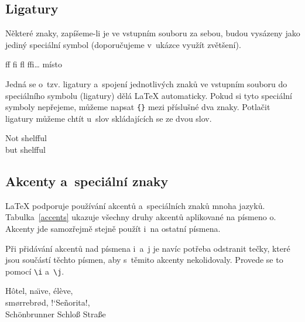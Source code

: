 \subsection{Ligatury}

Některé znaky, zapíšeme-li je ve vstupním souboru za sebou, budou
vysázeny jako jediný speciální symbol (doporučujeme v~ukázce využít zvětšení).
\begin{code}
{\large ff fi fl ffi\ldots}\quad
místo 
\end{code}
Jedná se o~tzv. ligatury a~spojení jednotlivých znaků ve vstupním
souboru do speciálního symbolu (ligatury) dělá \LaTeX{} automaticky. Pokud si
tyto speciální symboly nepřejeme, můžeme napsat \verb|{}|
mezi příslušné dva znaky. Potlačit ligatury můžeme chtít u~slov
skládajících se ze dvou slov.

\begin{example}
\Large Not shelfful\\
but shelf\mbox{}ful
\end{example}
 
\subsection{Akcenty a~speciální znaky}
 
\LaTeX{} podporuje používání akcentů
a~speciálních znaků
mnoha jazyků. Tabulka~\ref{accents} ukazuje všechny druhy akcentů
aplikované na písmeno o. Akcenty jde samozřejmě stejně použít
i~na ostatní písmena.

Při přidávání akcentů nad písmena i~a~j je navíc potřeba odstranit
tečky, které jsou součástí těchto písmen, aby s~těmito akcenty
nekolidovaly. Provede se to pomocí \verb|\i| a~\verb|\j|.

\begin{example}
H\^otel, na\"\i ve, \'el\`eve,\\ 
sm\o rrebr\o d, !`Se\~norita!,\\
Sch\"onbrunner Schlo\ss{} 
Stra\ss e
\end{example}

